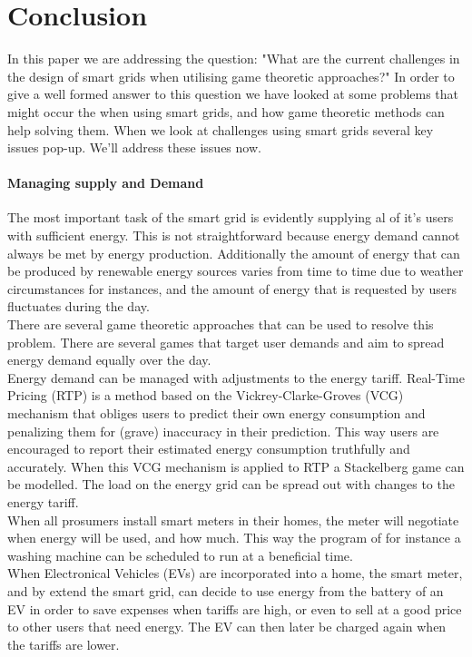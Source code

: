 \section{Conclusion}

In this paper we are addressing the question: "What are the current challenges in the design of smart grids when utilising game theoretic approaches?" In order to give a well formed answer to this question we have looked at some problems that might occur the when using smart grids, and how game theoretic methods can help solving them. When we look at challenges using smart grids several key issues pop-up. We'll address these issues now. 

\paragraph{Managing supply and Demand}
The most important task of the smart grid is evidently supplying al of it's users with sufficient energy. This is not straightforward because energy demand cannot always be met by energy production. Additionally the amount of energy that can be produced by renewable energy sources varies from time to time due to weather circumstances for instances, and the amount of energy that is requested by users fluctuates during the day. \\
There are several game theoretic approaches that can be used to resolve this problem. There are several games that target user demands and aim to spread energy demand equally over the day. \\
Energy demand can be managed with adjustments to the energy tariff. Real-Time Pricing (RTP) is a method based on the Vickrey-Clarke-Groves (VCG) mechanism that obliges users to predict their own energy consumption and penalizing them for (grave) inaccuracy in their prediction. This way users are encouraged to report their estimated energy consumption truthfully and accurately. When this VCG mechanism is applied to RTP a Stackelberg game can be modelled. The load on the energy grid can be spread out with changes to the energy tariff. \\
When all prosumers install smart meters in their homes, the meter will negotiate when energy will be used, and how much. This way the program of for instance a washing machine can be scheduled to run at a beneficial time. \\ 
When Electronical Vehicles (EVs) are incorporated into a home, the smart meter, and by extend the smart grid, can decide to use energy from the battery of an EV in order to save expenses when tariffs are high, or even to sell at a good price to other users that need energy. The EV can then later be charged again when the tariffs are lower. \\

